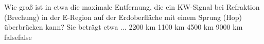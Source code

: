     {Wie groß ist in etwa die maximale Entfernung, die ein KW-Signal bei Refraktion (Brechung) in der E-Region auf der Erdoberfläche mit einem Sprung (Hop) überbrücken kann? Sie beträgt etwa ...}
    {2200 km}
    {1100 km}
    {4500 km}
    {9000 km}
    {false}{false}